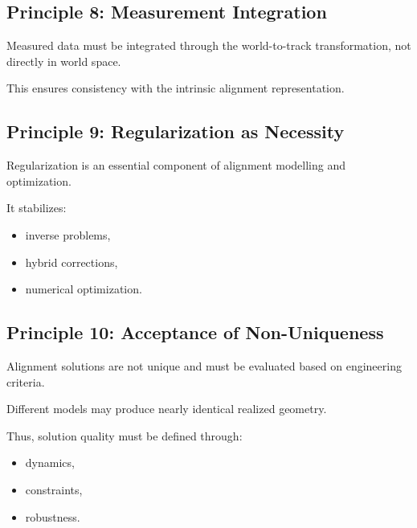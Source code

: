 \subsection{Principle 8: Measurement Integration}

\begin{proposition}
Measured data must be integrated through the world-to-track
transformation, not directly in world space.
\end{proposition}

This ensures consistency with the intrinsic alignment representation.


\subsection{Principle 9: Regularization as Necessity}

\begin{proposition}
Regularization is an essential component of alignment modelling and
optimization.
\end{proposition}

It stabilizes:
\begin{itemize}
\item inverse problems,
\item hybrid corrections,
\item numerical optimization.
\end{itemize}


\subsection{Principle 10: Acceptance of Non-Uniqueness}

\begin{proposition}
Alignment solutions are not unique and must be evaluated based on
engineering criteria.
\end{proposition}

Different models may produce nearly identical realized geometry.

Thus, solution quality must be defined through:
\begin{itemize}
\item dynamics,
\item constraints,
\item robustness.
\end{itemize}


